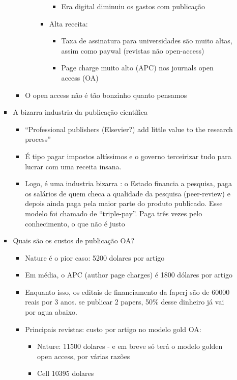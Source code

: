 \documentclass[11pt]{article}
\begin{document}
\begin{itemize}
\begin{itemize}
\begin{itemize}
\begin{itemize}
\begin{itemize}
\begin{itemize}
\begin{itemize}
\item Era digital diminuiu os gastos com publicação
\end{itemize}
\item Alta receita:
\begin{itemize}
\item Taxa de assinatura para universidades são muito altas, assim como paywal (revistas não open-access)
\item Page charge muito alto (APC) nos journals open access (OA)
\end{itemize}
\end{itemize}
\end{itemize}
\item O open access não é tão bonzinho quanto pensamos
\end{itemize}
\item A bizarra industria da publicação científica
\begin{itemize}
\item ``Professional publishers (Elsevier?) add little value to the research process''
\item É tipo pagar impostos altíssimos e o governo terceirizar tudo para lucrar com uma receita insana.
\item Logo, é uma industria bizarra : o Estado financia a pesquisa, paga os salários de quem checa a qualidade da pesquisa (peer-review) e depois ainda paga pela maior parte do produto publicado. Esse modelo foi chamado de ``triple-pay''. Paga três vezes pelo conhecimento, o que não é justo
\end{itemize}
\item Quais são os custos de publicação OA?
\begin{itemize}
\item Nature é o pior caso: 5200 dolares por artigo
\item Em média, o APC (author page charges) é 1800 dólares por artigo
\item Enquanto isso, os editais de financiamento da faperj são de 60000 reais por 3 anos. se publicar 2 papers, 50\% desse dinheiro já vai por agua abaixo.
\item Principais revistas: custo por artigo no modelo gold OA:
\begin{itemize}
\item Nature: 11500 dolares - e em breve só terá o modelo golden open access, por várias razões
\item Cell 10395 dolares
\end{itemize}
\end{itemize}

\end{itemize}
\end{itemize}
\end{itemize}
\end{document}
